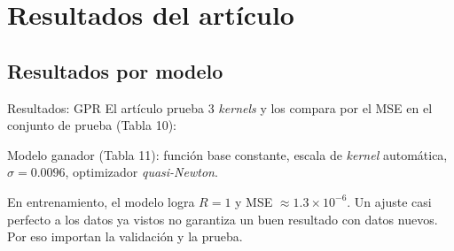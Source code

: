 \documentclass{beamer}
\begin{document}
\section{Resultados del artículo}

\subsection{Resultados por modelo}

\begin{frame}{Resultados: GPR}
    \justifying\small
    El artículo prueba 3 \textit{kernels} y los compara por el MSE en el conjunto de prueba (Tabla 10):
    \begin{table}
    \centering
    \end{table}
    \footnotesize Modelo ganador (Tabla 11): función base constante, escala de \textit{kernel} automática, $\sigma=0.0096$, optimizador \textit{quasi-Newton}.
    \medskip

    En entrenamiento, el modelo logra $R=1$ y MSE $\approx 1.3\times10^{-6}$. Un ajuste casi perfecto a los datos ya vistos no garantiza un buen resultado con datos nuevos. Por eso importan la validación y la prueba.
\end{frame}
\end{document}
